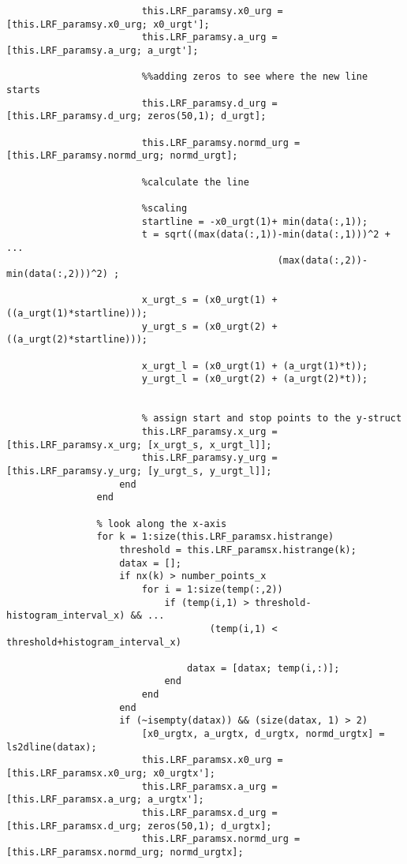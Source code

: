 \begin{lstlisting}
                        this.LRF_paramsy.x0_urg = [this.LRF_paramsy.x0_urg; x0_urgt'];
                        this.LRF_paramsy.a_urg = [this.LRF_paramsy.a_urg; a_urgt'];
                                
                        %%adding zeros to see where the new line starts
                        this.LRF_paramsy.d_urg = [this.LRF_paramsy.d_urg; zeros(50,1); d_urgt];
                        
                        this.LRF_paramsy.normd_urg =[this.LRF_paramsy.normd_urg; normd_urgt];
                        
                        %calculate the line
                        
                        %scaling
                        startline = -x0_urgt(1)+ min(data(:,1));
                        t = sqrt((max(data(:,1))-min(data(:,1)))^2 + ...
                                                (max(data(:,2))-min(data(:,2)))^2) ;
                        
                        x_urgt_s = (x0_urgt(1) + ((a_urgt(1)*startline)));
                        y_urgt_s = (x0_urgt(2) + ((a_urgt(2)*startline)));
                        
                        x_urgt_l = (x0_urgt(1) + (a_urgt(1)*t));
                        y_urgt_l = (x0_urgt(2) + (a_urgt(2)*t));
                        
                        
                        % assign start and stop points to the y-struct
                        this.LRF_paramsy.x_urg = [this.LRF_paramsy.x_urg; [x_urgt_s, x_urgt_l]];
                        this.LRF_paramsy.y_urg = [this.LRF_paramsy.y_urg; [y_urgt_s, y_urgt_l]];
                    end
                end
                
                % look along the x-axis
                for k = 1:size(this.LRF_paramsx.histrange)
                    threshold = this.LRF_paramsx.histrange(k);
                    datax = [];
                    if nx(k) > number_points_x
                        for i = 1:size(temp(:,2))
                            if (temp(i,1) > threshold-histogram_interval_x) && ...
                                    (temp(i,1) < threshold+histogram_interval_x)
                                
                                datax = [datax; temp(i,:)];
                            end
                        end
                    end
                    if (~isempty(datax)) && (size(datax, 1) > 2)
                        [x0_urgtx, a_urgtx, d_urgtx, normd_urgtx] = ls2dline(datax);
                        this.LRF_paramsx.x0_urg = [this.LRF_paramsx.x0_urg; x0_urgtx'];
                        this.LRF_paramsx.a_urg = [this.LRF_paramsx.a_urg; a_urgtx'];
                        this.LRF_paramsx.d_urg = [this.LRF_paramsx.d_urg; zeros(50,1); d_urgtx];
                        this.LRF_paramsx.normd_urg =[this.LRF_paramsx.normd_urg; normd_urgtx];
                        

\end{lstlisting}
